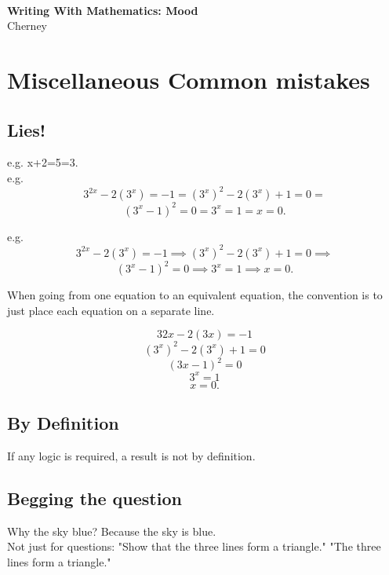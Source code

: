 \documentclass[12pt]{article}
\def\noi{\noindent}
\begin{document}
\thispagestyle{empty}
~
\vspace{-3.9cm}
\begin{center}
{
\Large
 {\bf  Writing With Mathematics: Mood}  \\[10mm]
 {  
 \vspace{-.9cm} 
Cherney}\\[1mm]
\vspace{3.5mm}
}

\end{center}





\section{Miscellaneous Common mistakes}

\subsection{Lies!}
e.g.  x+2=5=3.\\
e.g. 
\[3^{2x} -2(3^x) = -1 = (3^x)^2 -2(3^x) + 1 = 0 =\]
\[(3^x -1)^2 = 0 = 3^x = 1 = x = 0.\]

\noi e.g. 
\[3^{2x} -2(3^x) = -1\implies (3^x)^2 -2(3^x) + 1 = 0 \implies\]
\[(3^x -1)^2 = 0 \implies 3^x = 1 \implies x = 0.\]

\noi When going from one equation to an equivalent equation, the convention is to
just place each equation on a separate line.

\[32x -2(3x) = -1\]
\[(3^x)^2 -2(3^x) + 1 = 0\]
\[(3x -1)^2 = 0\]
\[3^x = 1\]
\[x = 0.\]

\subsection{By Definition}
If any logic is required, a result is not by definition. 

\subsection{Begging the question}
Why the sky blue? Because the sky is blue.\\
Not just for questions: "Show that the three lines form a triangle." "The three lines form a triangle."
\end{document}
